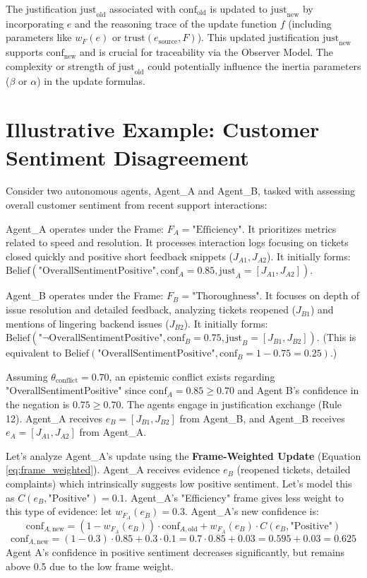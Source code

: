 \documentclass[10pt,a4paper]{article}
\begin{document}
The justification $\mathrm{just}_{\mathrm{old}}$ associated with $\mathrm{conf}_{\mathrm{old}}$ is updated to $\mathrm{just}_{\mathrm{new}}$ by incorporating $e$ and the reasoning trace of the update function $f$ (including parameters like $w_F(e)$ or $\mathrm{trust}(e_{\mathrm{source}}, F)$). This updated justification $\mathrm{just}_{\mathrm{new}}$ supports $\mathrm{conf}_{\mathrm{new}}$ and is crucial for traceability via the Observer Model. The complexity or strength of $\mathrm{just}_{\mathrm{old}}$ could potentially influence the inertia parameters ($\beta$ or $\alpha$) in the update formulas.


\section{Illustrative Example: Customer Sentiment Disagreement}
Consider two autonomous agents, Agent\_A and Agent\_B, tasked with assessing overall customer sentiment from recent support interactions:

Agent\_A operates under the Frame: $F_A = \text{"Efficiency"}$. It prioritizes metrics related to speed and resolution. It processes interaction logs focusing on tickets closed quickly and positive short feedback snippets ($J_{A1}, J_{A2}$). It initially forms:
$\mathrm{Belief}(\text{"OverallSentimentPositive"}, \mathrm{conf}_A=0.85, \mathrm{just}_A=[J_{A1}, J_{A2}])$.

Agent\_B operates under the Frame: $F_B = \text{"Thoroughness"}$. It focuses on depth of issue resolution and detailed feedback, analyzing tickets reopened ($J_{B1}$) and mentions of lingering backend issues ($J_{B2}$). It initially forms:
$\mathrm{Belief}(\text{"¬OverallSentimentPositive"}, \mathrm{conf}_B=0.75, \mathrm{just}_B=[J_{B1}, J_{B2}])$.
(This is equivalent to $\mathrm{Belief}(\text{"OverallSentimentPositive"}, \mathrm{conf}_B = 1 - 0.75 = 0.25)$.)

Assuming $\theta_{\mathrm{conflict}} = 0.70$, an epistemic conflict exists regarding "OverallSentimentPositive" since $\mathrm{conf}_A = 0.85 \geq 0.70$ and Agent B's confidence in the negation is $0.75 \geq 0.70$. The agents engage in justification exchange (Rule 12). Agent\_A receives $e_B = [J_{B1}, J_{B2}]$ from Agent\_B, and Agent\_B receives $e_A = [J_{A1}, J_{A2}]$ from Agent\_A.

Let's analyze Agent\_A's update using the \textbf{Frame-Weighted Update} (Equation \ref{eq:frame_weighted}). Agent\_A receives evidence $e_B$ (reopened tickets, detailed complaints) which intrinsically suggests low positive sentiment. Let's model this as $C(e_B, \text{"Positive"}) = 0.1$. Agent\_A's "Efficiency" frame gives less weight to this type of evidence: let $w_{F_A}(e_B) = 0.3$.
Agent\_A's new confidence is:
$$ \mathrm{conf}_{A,\mathrm{new}} = (1 - w_{F_A}(e_B)) \cdot \mathrm{conf}_{A,\mathrm{old}} + w_{F_A}(e_B) \cdot C(e_B, \text{"Positive"}) $$
$$ \mathrm{conf}_{A,\mathrm{new}} = (1 - 0.3) \cdot 0.85 + 0.3 \cdot 0.1 = 0.7 \cdot 0.85 + 0.03 = 0.595 + 0.03 = 0.625 $$
Agent A's confidence in positive sentiment decreases significantly, but remains above 0.5 due to the low frame weight.
\end{document}
